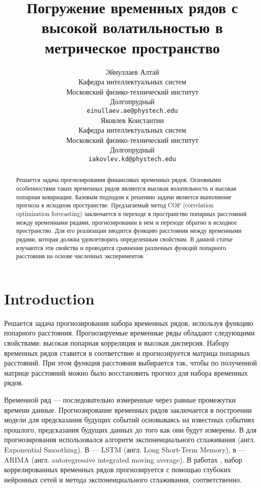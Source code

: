 \documentclass{article}
\title{Погружение временных рядов с высокой волатильностью в метрическое пространство}
\author{ Эйнуллаев Алтай \\
	Кафедра интеллектуальных систем\\
	Московский физико-технический институт\\
	Долгопрудный \\
	\texttt{einullaev.ae@phystech.edu} \\
	\And
	Яковлев Константин \\
	Кафедра интеллектуальных систем\\
	Московский физико-технический институт\\
	Долгопрудный \\
	\texttt{iakovlev.kd@phystech.edu} \\
}
\date{}
\begin{document}
\maketitle

\begin{abstract}
	Решается задача прогнозирования финансовых временных рядов. Основными особенностями таких временных рядов являются высокая волатильность и высокая попарная ковариация. Базовым подходом к решению задачи является выполнение прогноза в исходном пространстве. Предлагаемый метод COF (correlation optimization forecasting) заключается в переходе в пространство попарных расстояний между временными рядами, прогнозировании в нем и переходе обратно в исходное пространство. Для его реализации вводится функцию расстояния между временными рядами, которая должна удовлетворять определенным свойствам. В данной статье изучаются  эти свойства и проводятся сравнения различных функций попарного расстояния на основе численных экспериментов.

\end{abstract}



\section{Introduction}

Решается задача прогнозирования набора временных рядов, используя функцию попарного расстояния. Прогнозируемые временные ряды обладают следующими свойствами: высокая попарная корреляция и высокая дисперсия. Набору временных рядов ставится в соответствие и прогнозируется матрица попарных расстояний. При этом функция расстояния выбирается так, чтобы по полученной матрице расстояний можно было восстановить прогноз для набора временных рядов.

Временной ряд --- последовательно измеренные через равные промежутки времени данные. \cite{shumway2000time} Прогнозирование временных рядов заключается в построении модели для предсказания будущих событий основываясь на известных событиях прошлого, предсказания будущих данных до того как они будут измерены. В \cite{ES} для прогнозирования использовался алгоритм экспоненциального сглаживания (англ. Exponential Smoothing). В \cite{LSTM} --- LSTM (англ. Long Short-Term Memory), в \cite{ARIMA} --- ARIMA  (англ. autoregressive integrated moving average). В работах \cite{cirstea2018correlated}, \cite{corberan2011forecasting} набор коррелированных временных рядов прогнозируется с помощью глубоких нейронных сетей и метода экспоненциального сглаживания, соответственно.
\end{document}
